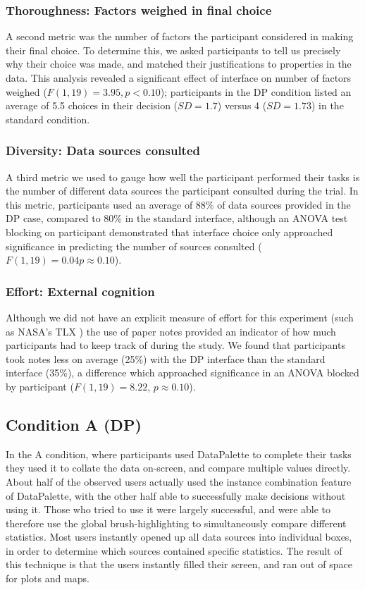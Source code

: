 \documentclass{sigchi}
\begin{document}
\subsubsection{Thoroughness: Factors weighed in final choice}
A second metric was the number of factors the participant considered in making their final choice. To determine this, we asked participants to tell us precisely why their choice was made, and matched their justifications to properties in the data.  This analysis revealed a significant effect of interface on number of factors weighed ($F(1,19)=3.95, p<0.10$); participants in the DP condition listed an average of 5.5 choices in their decision ($SD=1.7$) versus 4 ($SD=1.73$) in the standard condition.

\subsubsection{Diversity: Data sources consulted}
A third metric we used to gauge how well the participant performed their tasks is the number of different data sources the participant consulted during the trial. In this metric, participants used an average of 88\% of data sources provided in the DP case, compared to 80\% in the standard interface, although an ANOVA test blocking on participant demonstrated that interface choice only approached significance in predicting the number of sources consulted ($F(1,19)=0.04  p\approx0.10$).

\subsubsection{Effort: External cognition}
Although we did not have an explicit measure of effort for this experiment (such as NASA's TLX \cite{tlx}) the use of paper notes provided an indicator of how much participants had to keep track of during the study.  We found that participants took notes less on average (25\%) with the DP interface than the standard interface (35\%), a difference which approached significance in an ANOVA blocked by participant ($F(1,19)= 8.22$, $p\approx0.10$).

\subsection{Condition A (DP)}
In the A condition, where participants used DataPalette to complete their tasks they used it to collate the data on-screen, and compare multiple values directly. About half of the observed users actually used the instance combination feature of DataPalette, with the other half able to successfully make decisions without using it. Those who tried to use it were largely successful, and were able to therefore use the global brush-highlighting to simultaneously compare different statistics. Most users instantly opened up all data sources into individual boxes, in order to determine which sources contained specific statistics. The result of this technique is that the users instantly filled their screen, and ran out of space for plots and maps.
\end{document}
